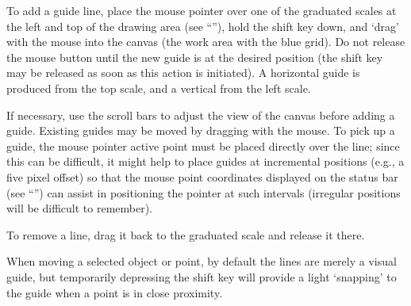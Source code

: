 		To add a guide line, place the mouse pointer
		over one of the graduated scales at the left
		and top of the drawing area
		(see ``''),
		hold the shift key
		down, and `drag' with the mouse into the canvas
		(the work area with the blue grid). Do not release
		the mouse button until the new guide is at the
		desired position (the shift key may be released
		as soon as this action is initiated). A horizontal
		guide is produced from the top scale, and a vertical
		 from the left scale.
		
		If necessary, use the scroll bars to adjust the
		view of the canvas before adding a guide. Existing guides
		may be moved by dragging with the mouse. To
		pick up a guide, the mouse pointer active point
		must be placed directly over the line; since this
		can be difficult, it might help to place guides
		at incremental positions (e.g., a five pixel offset)
		so that the mouse point coordinates displayed on the
		status bar (see ``'')
		can assist in positioning the pointer at such
		intervals (irregular positions will be difficult
		to remember).
		
		To remove a  line, drag it back to the
		graduated scale and release it there.
		
		When moving a selected object or point, by default
		the  lines are merely a visual guide,
		but temporarily depressing the shift key will
		provide a light `snapping' to the guide when a
		point is in close proximity.
















